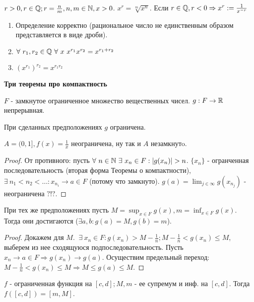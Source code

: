 \documentclass[12pt]{report}
\begin{document}
\begin{defn}
$r > 0, r \in \mathbb{Q}; r = \frac{n}{m}, n, m \in \mathbb{N}, x >0$. $x^r = \sqrt[m]{x^n}$. Если $r \in \mathbb{Q}, r < 0 \Rightarrow x^r := \frac{1}{x^{-r}}$
\end{defn}

\begin{probl}
\begin{enumerate}
\item Определение корректно (рациональное число не единственным образом представляется в виде дроби).
\item $\forall ~r_1, r_2 \in \mathbb{Q} ~\forall ~x  ~x^{r_1}x^{r_2} = x^{r_1 + r_2}$
\item $(x^{r_1})^{r_2} = x^{r_1r_2}$
\end{enumerate}
\end{probl}

{\bfseries Три теоремы про компактность}

$F$ - замкнутое ограниченное множество вещественных чисел. $g: F \to \mathbb{R}$ непрерывная. 

\begin{thm}
При сделанных предположениях $g$ ограничена.
\end{thm}
\begin{ex}
$A = (0, 1], f(x) = \frac{1}{x}$ неограничена, ну так и $A$ незамкнутo.
\end{ex}
\begin{proof}
От противного: пусть $\forall ~n \in \mathbb{N} ~\exists ~x_n \in F: |g(x_n)| > n$. $\{x_n\}$ - огранченная последовательность (вторая форма Теоремы о компактности), $\exists ~n_1 < n_2 < \dots: x_{n_i} \to a \in F$ (потому что замкнуто). $g(a) = \lim_{j \in \infty}{g(x_{n_j})}$ - неограничена $?!?$.
\end{proof}

\begin{thm}
При тех же предположениях пусть $M = \sup_{x \in F}{g(x)}, m = \inf_{x \in F}{g(x)}$. Тогда они достигаются ($\exists a, b: g(a) = M, g(b) = m$).
\end{thm}
\begin{proof}
Докажем для $M$. $~\exists ~x_n \in F: g(x_n) > M - \frac{1}{n}; M - \frac{1}{n} < g(x_n) \le M$, выберем из нее сходящуюся подпоследовательность. Пусть $x_n \to a \in F \Rightarrow g(x_n) \to g(a)$. Осуществим предельный переход: $M - \frac{1}{n} < g(x_n) \le M \Rightarrow M \le g(a)\le M$.
\end{proof}

\begin{cor}
$f$ - ограниченная функция на $[c, d]; M, m$ - ее супремум и инф. на $[c, d]$. Тогда $f([c, d]) = [m, M]$.
\end{cor}
\end{document}
